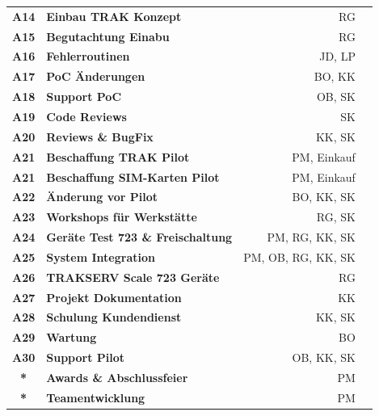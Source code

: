 \documentclass[a4paper,10pt]{scrartcl}
\begin{document}
\begin{tabular}{clrr}
\textbf{A14} &\textbf{Einbau TRAK Konzept} 				& RG\\
\textbf{A15} &\textbf{Begutachtung Einabu} 				& RG\\
\textbf{A16} &\textbf{Fehlerroutinen} 					& JD, LP\\
\textbf{A17} &\textbf{PoC Änderungen} 					& BO, KK\\
\textbf{A18} &\textbf{Support PoC} 						& OB, SK\\
\textbf{A19} &\textbf{Code Reviews} 						& SK\\
\textbf{A20} &\textbf{Reviews \& BugFix} 				& KK, SK\\
\textbf{A21} &\textbf{Beschaffung  TRAK Pilot} 			& PM, Einkauf\\
\textbf{A21} &\textbf{Beschaffung SIM-Karten Pilot} 		& PM, Einkauf\\
\textbf{A22} &\textbf{Änderung vor Pilot} 				& BO, KK, SK\\ %
\textbf{A23} &\textbf{Workshops für Werkstätte} 			& RG, SK\\
\textbf{A24} &\textbf{Geräte Test 723 \& Freischaltung} 	& PM, RG, KK, SK\\
\textbf{A25} &\textbf{System Integration} 				& PM, OB, RG, KK, SK\\
\textbf{A26} &\textbf{TRAKSERV Scale 723 Geräte} 		& RG\\
\textbf{A27} &\textbf{Projekt Dokumentation} 			& KK\\
\textbf{A28} &\textbf{Schulung Kundendienst} 			& KK, SK\\
\textbf{A29} &\textbf{Wartung} 							& BO\\
\textbf{A30} &\textbf{Support Pilot} 					& OB, KK, SK\\
\textbf{*} &\textbf{Awards \& Abschlussfeier} 			& PM\\
\textbf{*}&\textbf{Teamentwicklung} 					& PM  \\
\bottomrule
\end{tabular}
\begin{acronym}[Bash]
\end{acronym}
\end{document}
